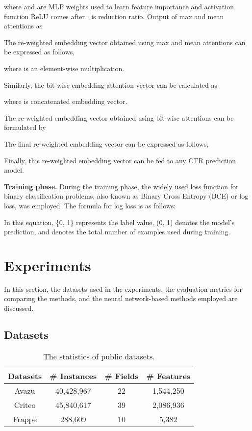 \documentclass{article}
\begin{document}
\noindent where  and  are MLP weights used to learn feature importance and activation function ReLU comes after .  is reduction ratio. Output of max and mean attentions as



The re-weighted embedding vector obtained using max and mean attentions can be expressed as follows,



\noindent where  is an element-wise multiplication.

Similarly, the bit-wise embedding attention vector  can be calculated as



\noindent where  is concatenated embedding vector.

\noindent The re-weighted embedding vector obtained using bit-wise attentions can be formulated by



\noindent The final re-weighted embedding vector  can be expressed as follows,



\noindent Finally, this re-weighted embedding vector can be fed to any CTR prediction model.

\noindent\textbf{Training phase.} During the training phase, the widely used loss function for binary classification problems, also known as Binary Cross Entropy (BCE) or log loss, was employed. The formula for log loss is as follows:



In this equation,  \{0, 1\} represents the label value,  (0, 1) denotes the model's prediction, and  denotes the total number of examples used during training.



\section{Experiments}

In this section, the datasets used in the experiments, the evaluation metrics for comparing the methods, and the neural network-based methods employed are discussed. 


\subsection{Datasets}


\begin{table}[tbh]
\caption{The statistics of public datasets.}
\label{table:datasets}
\begin{center}
\begin{tabular}{|c c c c|} 
\hline
 Datasets & \# Instances & \# Fields & \# Features\\ [0.5ex] 
 \hline \hline
 Avazu & 40,428,967 & 22 & 1,544,250 \\
 \hline
  Criteo & 45,840,617 & 39 & 2,086,936 \\
 \hline
 Frappe & 288,609 & 10 & 5,382 \\  [0.25ex]   
 \hline
\end{tabular}
\end{center}
\end{table}
\end{document}
